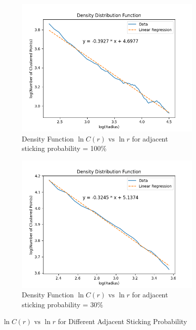 \documentclass[10pt]{article}
\begin{document}
\begin{figure}[h]
	\centering
	\begin{subfigure}[b]{0.3\textwidth}
		\centering
		\includegraphics[width=\textwidth]{Figure_4}
		\caption{Density Function $\ln C(r) \text{ vs } \ln r$ for adjacent sticking probability = 100\%}
	\end{subfigure}
	\begin{subfigure}[b]{0.3\textwidth}
		\centering
		\includegraphics[width=\textwidth]{Figure_5}
		\caption{Density Function $\ln C(r) \text{ vs } \ln r$ for adjacent sticking probability = 30\%}
	\end{subfigure}
	\caption{$\ln C(r) \text{ vs } \ln r$ for Different Adjacent Sticking Probability}
\end{figure}
\end{document}
